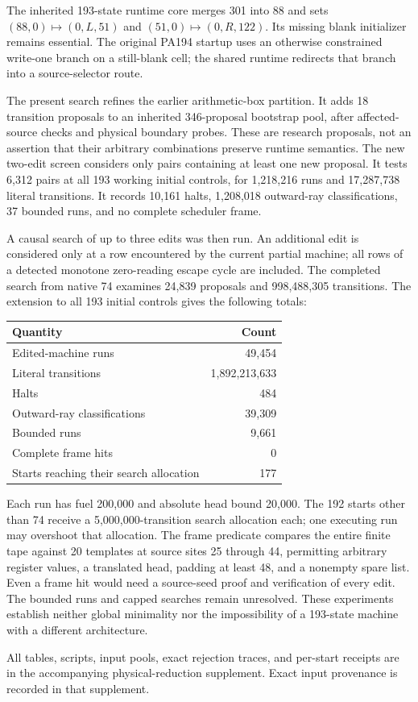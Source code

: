 The inherited 193-state runtime core merges 301 into 88 and sets
$(88,0)\mapsto(0,L,51)$ and $(51,0)\mapsto(0,R,122)$.
Its missing blank initializer remains essential. The original PA194 startup
uses an otherwise constrained write-one branch on a still-blank cell;
the shared runtime redirects that branch into a source-selector route.

The present search refines the earlier arithmetic-box partition. It
adds 18 transition proposals to an inherited 346-proposal bootstrap pool,
after affected-source checks and physical boundary probes. These are
research proposals, not an assertion that their arbitrary combinations
preserve runtime semantics. The new two-edit screen considers only
pairs containing at least one new proposal. It tests 6,312 pairs at all 193
working initial controls, for 1,218,216 runs and 17,287,738 literal
transitions. It records 10,161 halts, 1,208,018 outward-ray classifications,
37 bounded runs, and no complete scheduler frame.

A causal search of up to three edits was then run. An additional edit
is considered only at a row encountered by the current partial machine;
all rows of a detected monotone zero-reading escape cycle are included.
The completed search from native 74 examines 24,839 proposals and
998,488,305 transitions. The extension to all 193 initial controls gives
the following totals:
\begin{center}
\begin{tabular}{lr}
Quantity & Count\\\hline
Edited-machine runs &49,454\\
Literal transitions &1,892,213,633\\
Halts &484\\
Outward-ray classifications &39,309\\
Bounded runs &9,661\\
Complete frame hits &0\\
Starts reaching their search allocation &177
\end{tabular}
\end{center}
Each run has fuel 200,000 and absolute head bound 20,000. The 192 starts
other than 74 receive a 5,000,000-transition search allocation each;
one executing run may overshoot that allocation. The frame predicate
compares the entire finite tape against 20 templates at source sites 25
through 44, permitting arbitrary register values, a translated head,
padding at least 48, and a nonempty spare list. Even a frame hit would
need a source-seed proof and verification of every edit. The bounded
runs and capped searches remain unresolved. These experiments establish
neither global minimality nor the impossibility of a 193-state machine
with a different architecture.

All tables, scripts, input pools, exact rejection traces, and per-start
receipts are in the accompanying physical-reduction supplement. Exact input provenance is recorded in that supplement.
